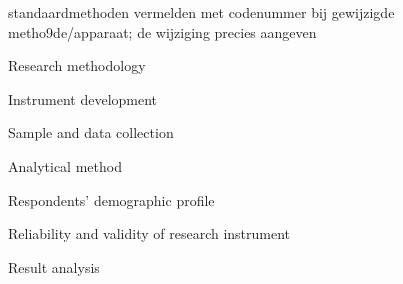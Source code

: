 

standaardmethoden vermelden met codenummer
bij gewijzigde metho9de/apparaat; de wijziging precies aangeven




Research methodology

Instrument development

Sample and data collection

Analytical method

Respondents’ demographic profile

Reliability and validity of research instrument

Result analysis